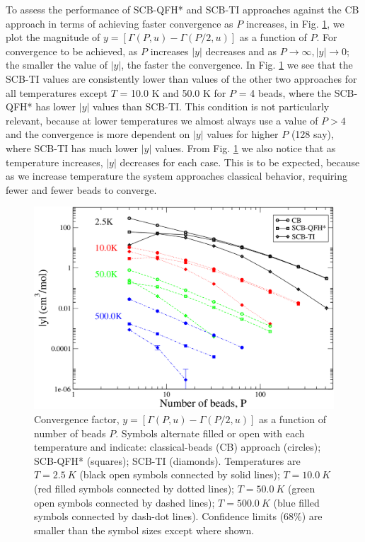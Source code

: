     To assess the performance of SCB-QFH* and SCB-TI approaches against the CB approach in terms of achieving faster convergence as $P$ increases, in Fig. \ref{shMag}, we plot the magnitude of $y = [\Gamma(P,u) - \Gamma(P/2,u)]$ as a function of $P$. For convergence to be achieved, as $P$ increases $|y|$ decreases and as $P \to \infty, |y| \to 0$; the smaller the value of $|y|$, the faster the convergence. In Fig. \ref{shMag} we see that the SCB-TI values are consistently lower than values of the other two approaches for all temperatures except $T$ = 10.0 K and 50.0 K for $P$ = 4 beads, where the SCB-QFH* has lower $|y|$ values than SCB-TI. This condition is not particularly relevant, because at lower temperatures we almost always use a value of $P > 4$ and the convergence is more dependent on $|y|$ values for higher $P$ (128 say), where SCB-TI has much lower $|y|$ values. From Fig. \ref{shMag} we also notice that as temperature increases, $|y|$ decreases for each case. This is to be expected, because as we increase temperature the system approaches classical behavior, requiring fewer and fewer beads to converge.
    \begin{figure}
        \centering
        \includegraphics[scale=0.3,keepaspectratio]{Chapter-3/Figures/shMagVsP.png}
        \caption{Convergence factor, $y = [\Gamma(P,u) - \Gamma(P/2,u)]$ as a function of number of beads $P$. Symbols alternate filled or open with each temperature and indicate: classical-beads (CB) approach (circles); SCB-QFH* (squares); SCB-TI (diamonds). Temperatures are $T = 2.5~K$ (black open symbols connected by solid lines); $T = 10.0~K$ (red filled symbols connected by dotted lines); $T = 50.0~K$ (green open symbols connected by dashed lines); $T = 500.0~K$ (blue filled symbols connected by dash-dot lines). Confidence limits (68\%) are smaller than the symbol sizes except where shown.} \label{shMag}
    \end{figure}

